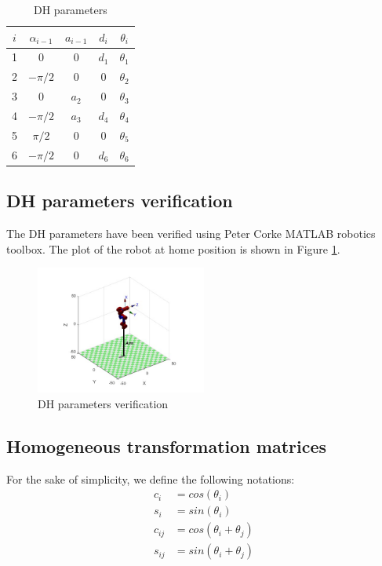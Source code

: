 \begin{table}[H]
    \centering
    \caption{DH parameters}
    \label{tab:dh}
    \begin{tabular}{|c|c|c|c|c|}
        \hline
        ${i}$ & $\alpha_{i-1}$ & $a_{i-1}$ & $d_i$ & $\theta_i$ \\\hline
        1     & 0              & 0         & $d_1$ & $\theta_1$ \\\hline
        2     & $-\pi/2$       & 0         & 0     & $\theta_2$ \\\hline
        3     & 0              & $a_2$     & 0     & $\theta_3$ \\\hline
        4     & $-\pi/2$       & $a_3$     & $d_4$ & $\theta_4$ \\\hline
        5     & $\pi/2$        & 0         & 0     & $\theta_5$ \\\hline
        6     & $-\pi/2$       & 0         & $d_6$ & $\theta_6$ \\
        \hline
    \end{tabular}
\end{table}
\subsection*{DH parameters verification}
The DH parameters have been verified using Peter Corke MATLAB robotics toolbox. The plot of the
robot at home position is shown in Figure \ref{fig:home}.
\begin{figure}[H]
    \centering
    \includegraphics[width=0.5\textwidth]{images/dh_home}
    \caption{DH parameters verification}
    \label{fig:home}
\end{figure}

\subsection{Homogeneous transformation matrices}\label{subsec:hom_transf}
For the sake of simplicity, we define the following notations:
\begin{equation}\label{eq:simplicity}
    \begin{split}
        c_i&=cos(\theta_i)\\
        s_i&=sin(\theta_i)\\
        c_{ij}&=cos(\theta_i+\theta_j)\\
        s_{ij}&=sin(\theta_i+\theta_j)
    \end{split}
\end{equation}

